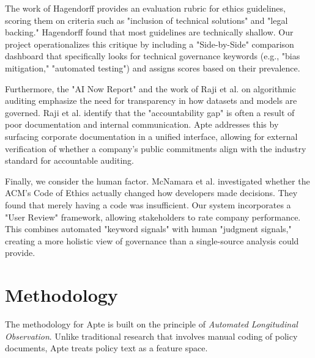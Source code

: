 \documentclass[conference]{IEEEtran}
\begin{document}
The work of Hagendorff \cite{hagendorff2020ethics} provides an evaluation rubric for ethics guidelines, scoring them on criteria such as "inclusion of technical solutions" and "legal backing." Hagendorff found that most guidelines are technically shallow. Our project operationalizes this critique by including a "Side-by-Side" comparison dashboard that specifically looks for technical governance keywords (e.g., "bias mitigation," "automated testing") and assigns scores based on their prevalence.

Furthermore, the "AI Now Report" \cite{whittaker2018ainow} and the work of Raji et al. on algorithmic auditing \cite{raji2020closing} emphasize the need for transparency in how datasets and models are governed. Raji et al. identify that the "accountability gap" is often a result of poor documentation and internal communication. Apte addresses this by surfacing corporate documentation in a unified interface, allowing for external verification of whether a company’s public commitments align with the industry standard for accountable auditing.

Finally, we consider the human factor. McNamara et al. \cite{mcnamara2018acm} investigated whether the ACM’s Code of Ethics actually changed how developers made decisions. They found that merely having a code was insufficient. Our system incorporates a "User Review" framework, allowing stakeholders to rate company performance. This combines automated "keyword signals" with human "judgment signals," creating a more holistic view of governance than a single-source analysis could provide.

\section{Methodology}

The methodology for Apte is built on the principle of \textit{Automated Longitudinal Observation}. Unlike traditional research that involves manual coding of policy documents, Apte treats policy text as a feature space.
\end{document}

